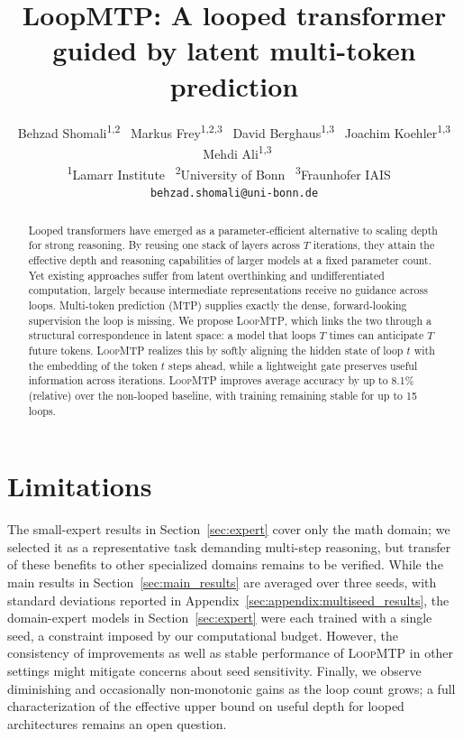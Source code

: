 \documentclass[11pt]{article}
\title{LoopMTP: A looped transformer guided by latent multi-token prediction}
\author{
    Behzad Shomali\textsuperscript{1,2} \   
    Markus Frey\textsuperscript{1,2,3} \
    David Berghaus\textsuperscript{1,3} \
    Joachim Koehler\textsuperscript{1,3}  \
    Mehdi Ali\textsuperscript{1,3} \\[6pt]
    \textsuperscript{1}Lamarr Institute \
    \textsuperscript{2}University of Bonn \
    \textsuperscript{3}Fraunhofer IAIS \ \\[6pt]
    \texttt{behzad.shomali@uni-bonn.de}
}
\begin{document}
\maketitle
\begin{abstract}
Looped transformers have emerged as a parameter-efficient alternative to scaling depth for strong reasoning. By reusing one stack of layers across $T$ iterations, they attain the effective depth and reasoning capabilities of larger models at a fixed parameter count. Yet existing approaches suffer from latent overthinking and undifferentiated computation, largely because intermediate representations receive no guidance across loops. Multi-token prediction (MTP) supplies exactly the dense, forward-looking supervision the loop is missing. We propose \textsc{LoopMTP}, which links the two through a structural correspondence in latent space: a model that loops $T$ times can anticipate $T$ future tokens. 
\textsc{LoopMTP} realizes this by softly aligning the hidden state of loop $t$ with the embedding of the token $t$ steps ahead, while a lightweight gate preserves useful information across iterations. \textsc{LoopMTP} improves average accuracy by up to 8.1\% (relative) over the non-looped baseline, with training remaining stable for up to 15 loops.
\end{abstract}







\section{Limitations}
The small-expert results in Section~\ref{sec:expert} cover only the math domain; we selected it as a representative task demanding multi-step reasoning, but transfer of these benefits to other specialized domains remains to be verified.
While the main results in Section~\ref{sec:main_results} are averaged over three seeds, with standard deviations reported in Appendix~\ref{sec:appendix:multiseed_results}, the domain-expert models in Section~\ref{sec:expert} were each trained with a single seed, a constraint imposed by our computational budget. However, the consistency of improvements as well as stable performance of \textsc{LoopMTP} in other settings might mitigate concerns about seed sensitivity.
Finally, we observe diminishing and occasionally non-monotonic gains as the loop count grows; a full characterization of the effective upper bound on useful depth for looped architectures remains an open question.
\end{document}
